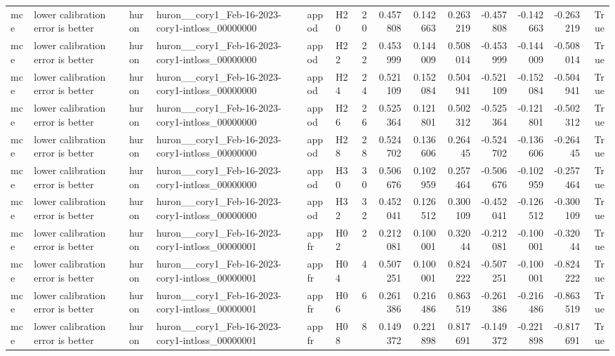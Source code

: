 \begin{longtable}{llllllrrrrrrrr}
mce & lower calibration error is better & huron & huron\_\_cory1\_Feb-16-2023-cory1-intloss\_00000000 & appod & H20 & 20 & 0.457808 & 0.142663 & 0.263219 & -0.457808 & -0.142663 & -0.263219 & True \\
mce & lower calibration error is better & huron & huron\_\_cory1\_Feb-16-2023-cory1-intloss\_00000000 & appod & H22 & 22 & 0.453999 & 0.144009 & 0.508014 & -0.453999 & -0.144009 & -0.508014 & True \\
mce & lower calibration error is better & huron & huron\_\_cory1\_Feb-16-2023-cory1-intloss\_00000000 & appod & H24 & 24 & 0.521109 & 0.152084 & 0.504941 & -0.521109 & -0.152084 & -0.504941 & True \\
mce & lower calibration error is better & huron & huron\_\_cory1\_Feb-16-2023-cory1-intloss\_00000000 & appod & H26 & 26 & 0.525364 & 0.121801 & 0.502312 & -0.525364 & -0.121801 & -0.502312 & True \\
mce & lower calibration error is better & huron & huron\_\_cory1\_Feb-16-2023-cory1-intloss\_00000000 & appod & H28 & 28 & 0.524702 & 0.136606 & 0.26445 & -0.524702 & -0.136606 & -0.26445 & True \\
mce & lower calibration error is better & huron & huron\_\_cory1\_Feb-16-2023-cory1-intloss\_00000000 & appod & H30 & 30 & 0.506676 & 0.102959 & 0.257464 & -0.506676 & -0.102959 & -0.257464 & True \\
mce & lower calibration error is better & huron & huron\_\_cory1\_Feb-16-2023-cory1-intloss\_00000000 & appod & H32 & 32 & 0.452041 & 0.126512 & 0.300109 & -0.452041 & -0.126512 & -0.300109 & True \\
mce & lower calibration error is better & huron & huron\_\_cory1\_Feb-16-2023-cory1-intloss\_00000001 & appfr & H02 & 2 & 0.212081 & 0.100001 & 0.32044 & -0.212081 & -0.100001 & -0.32044 & True \\
mce & lower calibration error is better & huron & huron\_\_cory1\_Feb-16-2023-cory1-intloss\_00000001 & appfr & H04 & 4 & 0.507251 & 0.100001 & 0.824222 & -0.507251 & -0.100001 & -0.824222 & True \\
mce & lower calibration error is better & huron & huron\_\_cory1\_Feb-16-2023-cory1-intloss\_00000001 & appfr & H06 & 6 & 0.261386 & 0.216486 & 0.863519 & -0.261386 & -0.216486 & -0.863519 & True \\
mce & lower calibration error is better & huron & huron\_\_cory1\_Feb-16-2023-cory1-intloss\_00000001 & appfr & H08 & 8 & 0.149372 & 0.221898 & 0.817691 & -0.149372 & -0.221898 & -0.817691 & True \\

\end{longtable}
